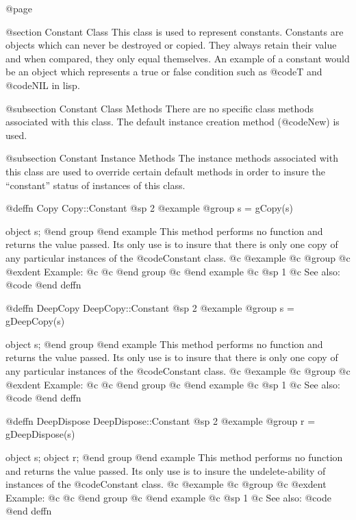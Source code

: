 @page

@section Constant Class
This class is used to represent constants.  Constants are objects which
can never be destroyed or copied.  They always retain their value and
when compared, they only equal themselves.  An example of a constant
would be an object which represents a true or false condition such
as @code{T} and @code{NIL} in lisp.

@subsection Constant Class Methods
There are no specific class methods associated with this class.  The
default instance creation method (@code{New}) is used.


@subsection Constant Instance Methods
The instance methods associated with this class are used to override
certain default methods in order to insure the ``constant'' status
of instances of this class.











@deffn {Copy} Copy::Constant
@sp 2
@example
@group
s = gCopy(s)

object  s;
@end group
@end example
This method performs no function and returns the value passed.  Its only
use is to insure that there is only one copy of any particular instances
of the @code{Constant} class.
@c @example
@c @group
@c @exdent Example:
@c 
@c @end group
@c @end example
@c @sp 1
@c See also:  @code{}
@end deffn












@deffn {DeepCopy} DeepCopy::Constant
@sp 2
@example
@group
s = gDeepCopy(s)

object  s;
@end group
@end example
This method performs no function and returns the value passed.  Its only
use is to insure that there is only one copy of any particular instances
of the @code{Constant} class.
@c @example
@c @group
@c @exdent Example:
@c 
@c @end group
@c @end example
@c @sp 1
@c See also:  @code{}
@end deffn







@deffn {DeepDispose} DeepDispose::Constant
@sp 2
@example
@group
r = gDeepDispose(s)

object  s;
object  r;
@end group
@end example
This method performs no function and returns the value passed.  Its only
use is to insure the undelete-ability of instances of the
@code{Constant} class.
@c @example
@c @group
@c @exdent Example:
@c 
@c @end group
@c @end example
@c @sp 1
@c See also:  @code{}
@end deffn












